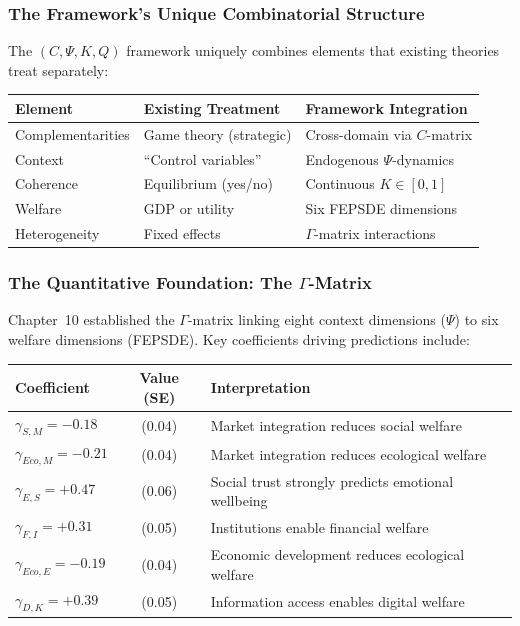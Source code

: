 \subsubsection{The Framework's Unique Combinatorial Structure}

The $(C, \Psi, K, Q)$ framework uniquely combines elements that existing theories treat separately:

\begin{center}
\renewcommand{\arraystretch}{1.3}
\begin{tabular}{lll}
\hline
\textbf{Element} & \textbf{Existing Treatment} & \textbf{Framework Integration} \\
\hline
Complementarities & Game theory (strategic) & Cross-domain via $C$-matrix \\
Context & ``Control variables'' & Endogenous $\Psi$-dynamics \\
Coherence & Equilibrium (yes/no) & Continuous $K \in [0,1]$ \\
Welfare & GDP or utility & Six FEPSDE dimensions \\
Heterogeneity & Fixed effects & $\Gamma$-matrix interactions \\
\hline
\end{tabular}
\end{center}

\subsubsection{The Quantitative Foundation: The $\Gamma$-Matrix}

Chapter~10 established the $\Gamma$-matrix linking eight context dimensions ($\Psi$) 
to six welfare dimensions (FEPSDE). Key coefficients driving predictions include:

\begin{center}
\small
\begin{tabular}{lcl}
\hline
\textbf{Coefficient} & \textbf{Value (SE)} & \textbf{Interpretation} \\
\hline
$\gamma_{S,M} = -0.18$ & (0.04) & Market integration reduces social welfare \\
$\gamma_{Eco,M} = -0.21$ & (0.04) & Market integration reduces ecological welfare \\
$\gamma_{E,S} = +0.47$ & (0.06) & Social trust strongly predicts emotional wellbeing \\
$\gamma_{F,I} = +0.31$ & (0.05) & Institutions enable financial welfare \\
$\gamma_{Eco,E} = -0.19$ & (0.04) & Economic development reduces ecological welfare \\
$\gamma_{D,K} = +0.39$ & (0.05) & Information access enables digital welfare \\
\hline
\end{tabular}
\end{center}

